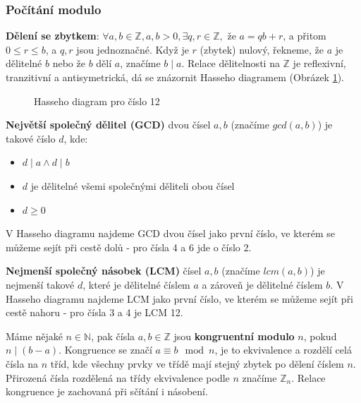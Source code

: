 \subsubsection{Počítání modulo}

\textbf{Dělení se zbytkem}: $\forall a, b \in \mathbb{Z}, a, b > 0, \exists q, r
\in \mathbb{Z},$ že $ a = qb + r$, a přitom $0 \leq r \le b$, a $q, r$ jsou
jednoznačné. Když je $r$ (zbytek) nulový, řekneme, že $a$ je dělitelné $b$ nebo
že $b$ dělí $a$, značíme $b \mid a$. Relace dělitelnosti na $\mathbb{Z}$ je
reflexivní, tranzitivní a antisymetrická, dá se znázornit Hasseho diagramem
(Obrázek \ref{fig:hasse}).

\begin{figure}[ht!]
\label{fig:hasse}
\centering
{}
\caption{Hasseho diagram pro číslo 12}
\end{figure}

\textbf{Největší společný dělitel (GCD)} dvou čísel $a, b$ (značíme $gcd(a,b)$)
je takové číslo $d$, kde:
\begin{itemize}
\item $d \mid a \wedge d \mid b$
\item $d$ je dělitelné všemi společnými děliteli obou čísel
\item $d \geq 0$
\end{itemize}
V Hasseho diagramu najdeme GCD dvou čísel jako první číslo, ve kterém se můžeme
sejít při cestě dolů - pro čísla 4 a 6 jde o číslo 2.

\textbf{Nejmenší společný násobek (LCM)} čísel $a, b$ (značíme $lcm(a, b)$) je
nejmenší takové $d$, které je dělitelné číslem $a$ a zároveň je dělitelné číslem
$b$. V Hasseho diagramu najdeme LCM jako první číslo, ve kterém se můžeme sejít
při cestě nahoru - pro čísla 3 a 4 je LCM 12.

Máme nějaké $n \in \mathbb{N}$, pak čísla $a, b \in \mathbb{Z}$ jsou
\textbf{kongruentní modulo} $n$, pokud $n \mid (b-a)$. Kongruence se značí $a
\equiv b\mod n$, je to ekvivalence a rozdělí celá čísla na $n$ tříd, kde všechny
prvky ve třídě mají stejný zbytek po dělení číslem $n$. Přirozená čísla
rozdělená na třídy ekvivalence podle $n$ značíme $\mathbb{Z}_n$. Relace
kongruence je zachovaná při sčítání i násobení.


